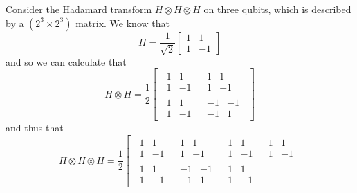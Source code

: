 \documentclass[fleqn]{article}
\begin{document}
\begin{enumerate}
  Consider the Hadamard transform \(H\otimes H\otimes H\) on three qubits, which is described by a \((2^3\times2^3)\) matrix.
  We know that
  \[
     H = \frac{1}{\sqrt2}\begin{bmatrix}1&1\\1&-1\end{bmatrix}
   \]
  and so we can calculate that
  \[
     H\otimes H
     = \frac12
     \left[
     \,
       \begin{array}{c|c}
         \begin{matrix}1&1\\1&-1\end{matrix}
         & \begin{matrix}1&1\\1&-1\end{matrix}
       \\\hline
         \begin{matrix}1&1\\1&-1\end{matrix}
         & \begin{matrix}-1&-1\\-1&1\end{matrix}
       \end{array}
     \,
     \right]
   \]
  and thus that
  \[
     H\otimes H\otimes H
     = \frac12
     \left[
     \,
       \begin{array}{c|c|c|c}
         \begin{matrix}1&1\\1&-1\end{matrix}
         & \begin{matrix}1&1\\1&-1\end{matrix}
         & \begin{matrix}1&1\\1&-1\end{matrix}
         & \begin{matrix}1&1\\1&-1\end{matrix}
       \\\hline
         \begin{matrix}1&1\\1&-1\end{matrix}
         & \begin{matrix}-1&-1\\-1&1\end{matrix}
         & \begin{matrix}1&1\\1&-1\end{matrix}

\end{array}\]
\end{enumerate}
\end{document}
